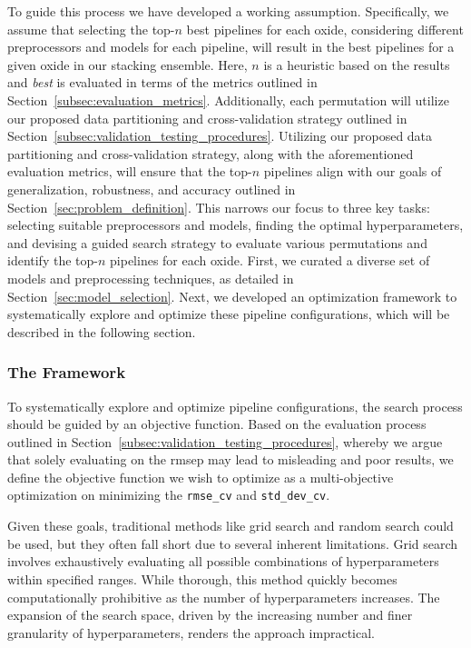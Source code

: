 To guide this process we have developed a working assumption.
Specifically, we assume that selecting the top-$n$ best pipelines for each oxide, considering different preprocessors and models for each pipeline, will result in the best pipelines for a given oxide in our stacking ensemble.
Here, $n$ is a heuristic based on the results and \textit{best} is evaluated in terms of the metrics outlined in Section~\ref{subsec:evaluation_metrics}.
Additionally, each permutation will utilize our proposed data partitioning and cross-validation strategy outlined in Section~\ref{subsec:validation_testing_procedures}.
Utilizing our proposed data partitioning and cross-validation strategy, along with the aforementioned evaluation metrics, will ensure that the top-$n$ pipelines align with our goals of generalization, robustness, and accuracy outlined in Section~\ref{sec:problem_definition}.
This narrows our focus to three key tasks: selecting suitable preprocessors and models, finding the optimal hyperparameters, and devising a guided search strategy to evaluate various permutations and identify the top-$n$ pipelines for each oxide.
First, we curated a diverse set of models and preprocessing techniques, as detailed in Section~\ref{sec:model_selection}.
Next, we developed an optimization framework to systematically explore and optimize these pipeline configurations, which will be described in the following section.

\subsubsection{The Framework}
To systematically explore and optimize pipeline configurations, the search process should be guided by an objective function.
Based on the evaluation process outlined in Section~\ref{subsec:validation_testing_procedures}, whereby we argue that solely evaluating on the \gls{rmsep} may lead to misleading and poor results, we define the objective function we wish to optimize as a multi-objective optimization on minimizing the \texttt{rmse\_cv} and \texttt{std\_dev\_cv}.

Given these goals, traditional methods like grid search and random search could be used, but they often fall short due to several inherent limitations.
Grid search involves exhaustively evaluating all possible combinations of hyperparameters within specified ranges.
While thorough, this method quickly becomes computationally prohibitive as the number of hyperparameters increases. The expansion of the search space, driven by the increasing number and finer granularity of hyperparameters, renders the approach impractical.

